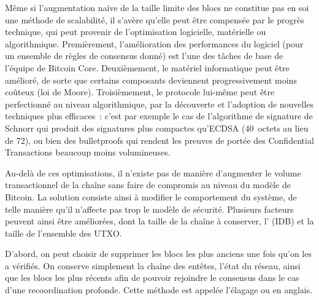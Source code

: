 Même si l'augmentation naïve de la taille limite des blocs ne constitue pas en soi une méthode de scalabilité, il s'avère qu'elle peut être compensée par le progrès technique, qui peut provenir de l'optimisation logicielle, matérielle ou algorithmique. Premièrement, l'amélioration des performances du logiciel (pour un ensemble de règles de consensus donné) est l'une des tâches de base de l'équipe de Bitcoin Core. Deuxièmement, le matériel informatique peut être amélioré, de sorte que certains composants deviennent progressivement moins coûteux (loi de Moore). Troisièmement, le protocole lui-même peut être perfectionné au niveau algorithmique, par la découverte et l'adoption de nouvelles techniques plus efficaces~: c'est par exemple le cas de l'algorithme de signature de Schnorr qui produit des signatures plus compactes qu'ECDSA (40~octets au lieu de 72), ou bien des bulletproofs qui rendent les preuves de portée des Confidential Transactions beaucoup moins volumineuses.

Au-delà de ces optimisations, il n'existe pas de manière d'augmenter le volume transactionnel de la chaîne sans faire de compromis au niveau du modèle de Bitcoin. La solution consiste ainsi à modifier le comportement du système, de telle manière qu'il n'affecte pas trop le modèle de sécurité. Plusieurs facteurs peuvent ainsi être améliorées, dont la taille de la chaîne à conserver, l' (IDB) et la taille de l'ensemble des UTXO.

D'abord, on peut choisir de supprimer les blocs les plus anciens une fois qu'on les a vérifiés. On conserve simplement la chaîne des entêtes, l'état du réseau, ainsi que les blocs les plus récents afin de pouvoir rejoindre le consensus dans le cas d'une recoordination profonde. Cette méthode est appelée l'élagage ou  en anglais.


